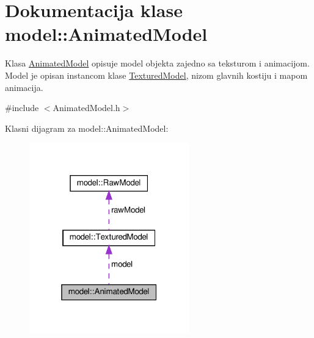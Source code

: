 \hypertarget{classmodel_1_1AnimatedModel}{}\section{Dokumentacija klase model\+:\+:Animated\+Model}
\label{classmodel_1_1AnimatedModel}


Klasa \hyperlink{classmodel_1_1AnimatedModel}{Animated\+Model} opisuje model objekta zajedno sa teksturom i animacijom. Model je opisan instancom klase \hyperlink{classmodel_1_1TexturedModel}{Textured\+Model}, nizom glavnih kostiju i mapom animacija.  




{\ttfamily \#include $<$Animated\+Model.\+h$>$}



Klasni dijagram za model\+:\+:Animated\+Model\+:
\nopagebreak
\begin{figure}[H]
\begin{center}
\leavevmode
\includegraphics[width=196pt]{classmodel_1_1AnimatedModel__coll__graph}
\end{center}
\end{figure}
